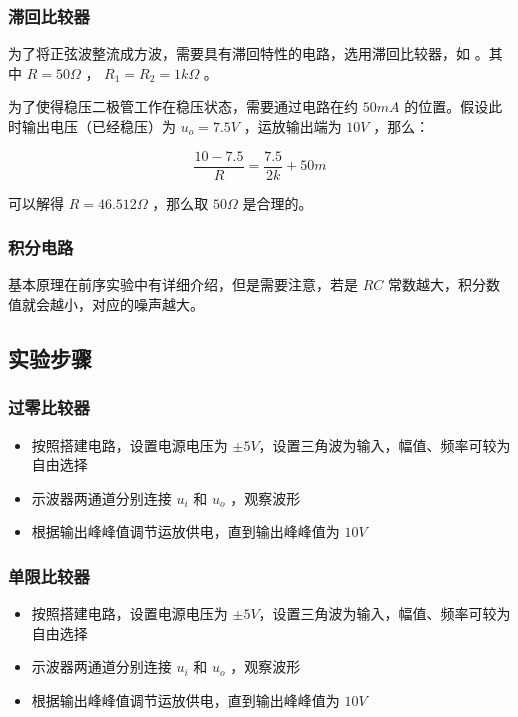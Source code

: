 \documentclass[lang=cn,11pt,a4paper,cite=authoryear]{elegantpaper}
\begin{document}

\subsubsection{滞回比较器}

为了将正弦波整流成方波，需要具有滞回特性的电路，选用滞回比较器，如  。其中 \(R = 50 \Omega\) ， \(R_1 = R_2 = 1 k\Omega\) 。

为了使得稳压二极管工作在稳压状态，需要通过电路在约 \(50 mA\) 的位置。假设此时输出电压（已经稳压）为 \(u_o = 7.5 V\) ，运放输出端为 \(10 V\) ，那么：

\[\frac{10 - 7.5}{R} = \frac{7.5}{2 k} + 50 m\]

可以解得 \(R = 46.512 \Omega\) ，那么取 \(50 \Omega\) 是合理的。


\subsubsection{积分电路} 

基本原理在前序实验中有详细介绍，但是需要注意，若是 \(R C\) 常数越大，积分数值就会越小，对应的噪声越大。

\subsection{实验步骤}

\subsubsection{过零比较器}

\begin{itemize}
    \item 按照搭建电路，设置电源电压为 \(\pm 5 V\)，设置三角波为输入，幅值、频率可较为自由选择
    \item 示波器两通道分别连接 \(u_i\) 和 \(u_o\) ，观察波形
    \item 根据输出峰峰值调节运放供电，直到输出峰峰值为 \(10 V\)
\end{itemize}


\subsubsection{单限比较器}

\begin{itemize}
    \item 按照搭建电路，设置电源电压为 \(\pm 5 V\)，设置三角波为输入，幅值、频率可较为自由选择
    \item 示波器两通道分别连接 \(u_i\) 和 \(u_o\) ，观察波形
    \item 根据输出峰峰值调节运放供电，直到输出峰峰值为 \(10 V\)
\end{itemize}
\end{document}
